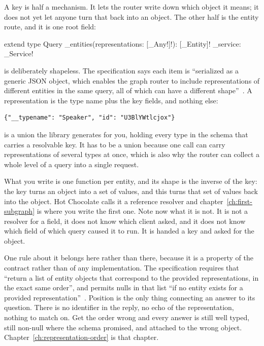 %
A key is half a mechanism. It lets the router write down which object it means;
it does not yet let anyone turn that back into an object. The other half is the
entity route, and it is one root field:

\begin{graphqlsdl}
extend type Query {
  _entities(representations: [_Any!]!): [_Entity]!
  _service: _Service!
}
\end{graphqlsdl}

%
 is deliberately shapeless. The specification says each item is
\enquote{serialized as a generic JSON object, which enables the graph router to
include representations of different entities in the same query, all of which
can have a different shape}~\autocite{apollosubgraphspec}. A representation is
the type name plus the key fields, and nothing else:

\begin{verbatim}
{"__typename": "Speaker", "id": "U3BlYWtlcjox"}
\end{verbatim}

%
 is a union the library generates for you, holding every type in
the schema that carries a resolvable key. It has to be a union because one call
can carry representations of several types at once, which is also why the router
can collect a whole level of a query into a single request.

%
What you write is one function per entity, and its shape is the inverse of the
key: the key turns an object into a set of values, and this turns that set of
values back into the object. Hot Chocolate calls it a reference resolver and
chapter~\ref{ch:first-subgraph} is where you write the first one. Note now what
it is not. It is not a resolver for a field, it does not know which client
asked, and it does not know which field of which query caused it to run. It is
handed a key and asked for the object.

%
One rule about it belongs here rather than there, because it is a property of
the contract rather than of any implementation. The specification requires that
 \enquote{return a list of entity objects that correspond to
the provided representations, in the exact same order}, and permits nulls in
that list \enquote{if no entity exists for a provided
representation}~\autocite{apollosubgraphspec}. Position is the only thing
connecting an answer to its question. There is no identifier in the reply, no
echo of the representation, nothing to match on. Get the order wrong and every
answer is still well typed, still non-null where the schema promised, and
attached to the wrong object. Chapter~\ref{ch:representation-order} is that
chapter.

